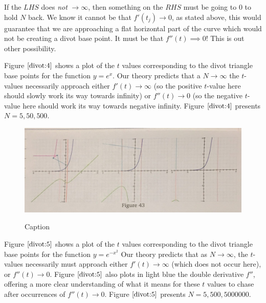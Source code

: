 If the $LHS$ does \textit{not} $\xrightarrow{} \infty$, then something on the $RHS$ must be going to 0 to hold $N$ back. We know it cannot be that $f'(t_j) \xrightarrow{} 0$, as stated above, this would guarantee that we are approaching a flat horizontal part of the curve which would not be creating a divot base point. It must be that $f''(t) \implies 0$! This is out other possibility.

Figure $\ref{divot:4}$ shows a plot of the $t$ values corresponding to the divot triangle base points for the function $y = e^x$. Our theory predicts that a $N \xrightarrow{} \infty$ the $t$-values necessarily approach either $f'(t) \xrightarrow{} \infty$ (so the positive $t$-value here should slowly work its way towards infinity) or $f''(t) \xrightarrow{} 0$ (so the negative $t$-value here should work its way towards negative infinity. Figure $\ref{divot:4}$ presents $N = 5, 50, 500$.

\renewcommand\w{0.9\textwidth}
\renewcommand\fw{0.9\linewidth}
\renewcommand\fh{.25\textheight}

\begin{figure}[H]
  \centering
  \begin{minipage}[b]{\w}
    \label{divot:4}
    \includegraphics[width=\fw, height=\fh, keepaspectratio]{img/12-divot/04.png}
    \caption{Caption}
  \end{minipage}
\end{figure}

Figure $\ref{divot:5}$ shows a plot of the $t$ values corresponding to the divot triangle base points for the function $y = e^{-x^2}$ Our theory predicts that as $N \xrightarrow{} \infty$, the $t$-values necessarily must approach either $f'(t) \xrightarrow{} \infty$ (which does not occur here), or $f''(t) \xrightarrow{} 0$. Figure $\ref{divot:5}$ also plots in light blue the double derivative $f''$, offering a more clear understanding of what it means for these $t$ values to chase after occurrences of $f''(t) \xrightarrow{} 0$. Figure $\ref{divot:5}$ presents $N = 5, 500, 5000000$.

